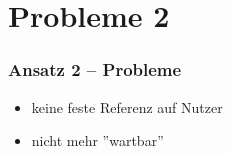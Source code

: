 \section{Probleme 2}
\begin{frame}
	\frametitle{Ansatz 2 -- Probleme}
	\begin{itemize}
		\item<2-> keine feste Referenz auf Nutzer
		\item<3-> nicht mehr ''wartbar''
	\end{itemize}
\end{frame}
